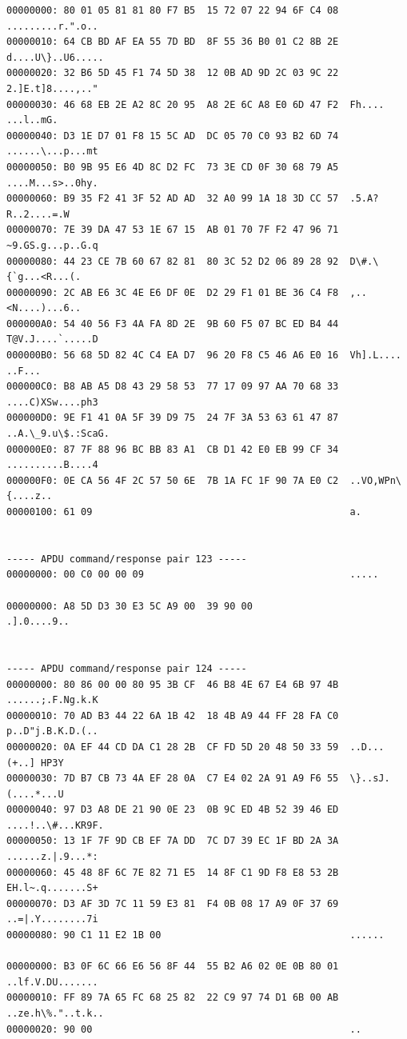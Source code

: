 \documentclass[bsc,frontabs,twoside,singlespacing,parskip,deptreport]{infthesis}     %
\begin{document}
\begin{appendices}
\begin{Verbatim}[commandchars=\\\{\}, fontsize=\small]
00000000: 80 01 05 81 81 80 F7 B5  15 72 07 22 94 6F C4 08  .........r.".o..
00000010: 64 CB BD AF EA 55 7D BD  8F 55 36 B0 01 C2 8B 2E  d....U\}..U6.....
00000020: 32 B6 5D 45 F1 74 5D 38  12 0B AD 9D 2C 03 9C 22  2.]E.t]8....,.."
00000030: 46 68 EB 2E A2 8C 20 95  A8 2E 6C A8 E0 6D 47 F2  Fh.... ...l..mG.
00000040: D3 1E D7 01 F8 15 5C AD  DC 05 70 C0 93 B2 6D 74  ......\...p...mt
00000050: B0 9B 95 E6 4D 8C D2 FC  73 3E CD 0F 30 68 79 A5  ....M...s>..0hy.
00000060: B9 35 F2 41 3F 52 AD AD  32 A0 99 1A 18 3D CC 57  .5.A?R..2....=.W
00000070: 7E 39 DA 47 53 1E 67 15  AB 01 70 7F F2 47 96 71  ~9.GS.g...p..G.q
00000080: 44 23 CE 7B 60 67 82 81  80 3C 52 D2 06 89 28 92  D\#.\{`g...<R...(.
00000090: 2C AB E6 3C 4E E6 DF 0E  D2 29 F1 01 BE 36 C4 F8  ,..<N....)...6..
000000A0: 54 40 56 F3 4A FA 8D 2E  9B 60 F5 07 BC ED B4 44  T@V.J....`.....D
000000B0: 56 68 5D 82 4C C4 EA D7  96 20 F8 C5 46 A6 E0 16  Vh].L.... ..F...
000000C0: B8 AB A5 D8 43 29 58 53  77 17 09 97 AA 70 68 33  ....C)XSw....ph3
000000D0: 9E F1 41 0A 5F 39 D9 75  24 7F 3A 53 63 61 47 87  ..A.\_9.u\$.:ScaG.
000000E0: 87 7F 88 96 BC BB 83 A1  CB D1 42 E0 EB 99 CF 34  ..........B....4
000000F0: 0E CA 56 4F 2C 57 50 6E  7B 1A FC 1F 90 7A E0 C2  ..VO,WPn\{....z..
00000100: 61 09                                             a.


----- APDU command/response pair 123 -----
00000000: 00 C0 00 00 09                                    .....

00000000: A8 5D D3 30 E3 5C A9 00  39 90 00                 .].0....9..


----- APDU command/response pair 124 -----
00000000: 80 86 00 00 80 95 3B CF  46 B8 4E 67 E4 6B 97 4B  ......;.F.Ng.k.K
00000010: 70 AD B3 44 22 6A 1B 42  18 4B A9 44 FF 28 FA C0  p..D"j.B.K.D.(..
00000020: 0A EF 44 CD DA C1 28 2B  CF FD 5D 20 48 50 33 59  ..D...(+..] HP3Y
00000030: 7D B7 CB 73 4A EF 28 0A  C7 E4 02 2A 91 A9 F6 55  \}..sJ.(....*...U
00000040: 97 D3 A8 DE 21 90 0E 23  0B 9C ED 4B 52 39 46 ED  ....!..\#...KR9F.
00000050: 13 1F 7F 9D CB EF 7A DD  7C D7 39 EC 1F BD 2A 3A  ......z.|.9...*:
00000060: 45 48 8F 6C 7E 82 71 E5  14 8F C1 9D F8 E8 53 2B  EH.l~.q.......S+
00000070: D3 AF 3D 7C 11 59 E3 81  F4 0B 08 17 A9 0F 37 69  ..=|.Y........7i
00000080: 90 C1 11 E2 1B 00                                 ......

00000000: B3 0F 6C 66 E6 56 8F 44  55 B2 A6 02 0E 0B 80 01  ..lf.V.DU.......
00000010: FF 89 7A 65 FC 68 25 82  22 C9 97 74 D1 6B 00 AB  ..ze.h\%."..t.k..
00000020: 90 00                                             ..



\end{Verbatim}
\end{appendices}
\end{document}
